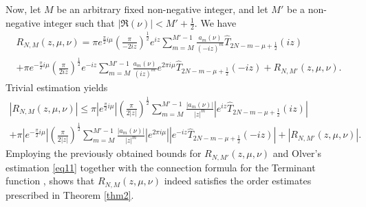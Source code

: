 \documentclass[a4paper,twoside,10pt]{amsart}
\numberwithin{equation}{section}
\begin{document}
Now, let $M$ be an arbitrary fixed non-negative integer, and let $M'$ be a non-negative integer such that $\left| {\Re \left( \nu  \right)} \right| < M' + \frac{1}{2}$. We have
\begin{multline*}
R_{N,M} \left( {z,\mu ,\nu } \right) = \pi e^{\frac{\pi }{2}i\mu } \left( {\frac{\pi }{{ - 2iz}}} \right)^{\frac{1}{2}} e^{iz} \sum\limits_{m = M}^{M' - 1} {\frac{{a_m \left( \nu  \right)}}{{\left( { - iz} \right)^m }}\widehat T_{2N - m - \mu  + \frac{1}{2}} \left( {iz} \right)} 
\\ + \pi e^{ - \frac{\pi }{2}i\mu } \left( {\frac{\pi }{{2iz}}} \right)^{\frac{1}{2}} e^{ - iz} \sum\limits_{m = M}^{M' - 1} {\frac{{a_m \left( \nu  \right)}}{{\left( {iz} \right)^m }}e^{2\pi i\mu } \widehat T_{2N - m - \mu  + \frac{1}{2}} \left( { - iz} \right)}  + R_{N,M'} \left( {z,\mu ,\nu } \right).
\end{multline*}
Trivial estimation yields
\begin{multline*}
\left| {R_{N,M} \left( {z,\mu ,\nu } \right)} \right| \le \pi \left| {e^{\frac{\pi }{2}i\mu } } \right|\left( {\frac{\pi }{{2\left| z \right|}}} \right)^{\frac{1}{2}} \sum\limits_{m = M}^{M' - 1} {\frac{{\left| {a_m \left( \nu  \right)} \right|}}{{\left| z \right|^m }}\left| {e^{iz} \widehat T_{2N - m - \mu  + \frac{1}{2}} \left( {iz} \right)} \right|} 
\\  + \pi \left| {e^{ - \frac{\pi }{2}i\mu } } \right|\left( {\frac{\pi }{{2\left| z \right|}}} \right)^{\frac{1}{2}} \sum\limits_{m = M}^{M' - 1} {\frac{{\left| {a_m \left( \nu  \right)} \right|}}{{\left| z \right|^m }}\left| {e^{2\pi i\mu } } \right|\left| {e^{ - iz} \widehat T_{2N - m - \mu  + \frac{1}{2}} \left( { - iz} \right)} \right|}  + \left| {R_{N,M'} \left( {z,\mu ,\nu } \right)} \right|.
\end{multline*}
Employing the previously obtained bounds for $R_{N,M'} \left( {z,\mu ,\nu } \right)$ and Olver's estimation \eqref{eq11} together with the connection formula for the Terminant function \cite[p. 260]{Paris3}, shows that $R_{N,M} \left( {z,\mu ,\nu } \right)$ indeed satisfies the order estimates prescribed in Theorem \ref{thm2}.
\end{document}
